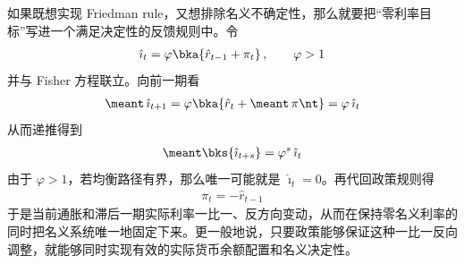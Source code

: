 \myskip
{}

如果既想实现 Friedman rule，又想排除名义不确定性，那么就要把“零利率目标”写进一个满足决定性的反馈规则中。令
\begin{align*}
    \hat\imath_t=\varphi\bka{\hat r_{t-1}+\pi_t}\,,\qquad \varphi>1
\end{align*}
并与 Fisher 方程联立。向前一期看
\begin{align*}
    \meant\,\hat\imath_{t+1}
    =\varphi\bka{\hat r_t+\meant\,\pi\nt}
    =\varphi\,\hat\imath_t
\end{align*}
从而递推得到
\begin{align*}
    \meant\bks{\hat\imath_{t+s}}=\varphi^s\,\hat\imath_t
\end{align*}
由于 \(\varphi>1\)，若均衡路径有界，那么唯一可能就是 \(\hat\imath_t=0\)。再代回政策规则得
\begin{align*}
    \pi_t=-\hat r_{t-1}
\end{align*}
于是当前通胀和滞后一期实际利率一比一、反方向变动，从而在保持零名义利率的同时把名义系统唯一地固定下来。更一般地说，只要政策能够保证这种一比一反向调整，就能够同时实现有效的实际货币余额配置和名义决定性。



\SymmetricGeometry
